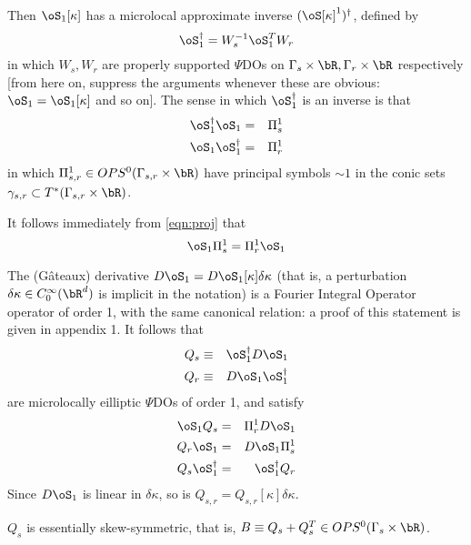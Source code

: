Then 
$\oS_1[\kappa]$ has a microlocal approximate inverse $(\oS[\kappa]^1)^{\dagger}$, defined by 
\begin{equation}
\label{eqn:appinv}
\oS_1^{\dagger} = W_s^{-1}\oS_1^TW_r
\end{equation}
in which $W_s, W_r$ are properly supported $\Psi$DOs on $\Gamma_s \times \bR,\Gamma_r \times \bR$ respectively [from here on, suppress the arguments whenever these are obvious: $\oS_1 = \oS_1[\kappa]$ and so on]. The sense in which $\oS_1^{\dagger}$ is an inverse is that
\begin{eqnarray}
\label{eqn:proj}
\oS_1^{\dagger}\oS_1 &=& \Pi^1_s\\
\oS_1 \oS_1^{\dagger} &=& \Pi^1_r
\end{eqnarray}
in which $\Pi^1_{s,r} \in OPS^0(\Gamma_{s,r}\times \bR)$ have principal symbols $\sim 1$ in the conic sets $\gamma_{s,r} \subset T^*(\Gamma_{s,r}\times \bR)$.

It follows immediately from \ref{eqn:proj} that
\begin{equation}
\label{eqn:picomm}
\oS_1 \Pi^1_s = \Pi^1_r\oS_1
\end{equation}

The (G\^{a}teaux) derivative $D\oS_1 = D\oS_1[\kappa]\delta \kappa$ (that is, a perturbation $\delta \kappa \in C_0^{\infty}(\bR^d)$ is implicit in the notation) is a Fourier Integral Operator operator of order 1, with the same canonical relation: a proof of this statement is given in appendix 1. It follows that
\begin{eqnarray}
\label{eqn:qdef}
Q_s &\equiv& \oS_1^{\dagger}D\oS_1 \nonumber \\
Q_r &\equiv& D\oS_1 \oS_1^{\dagger} 
\end{eqnarray}
are microlocally eilliptic $\Psi$DOs of order 1, and satisfy
\begin{eqnarray}
\label{eqn:qrel}
\oS_1 Q_s &=& \Pi^1_r D\oS_1 \nonumber \\
Q_r \oS_1 &=& D\oS_1 \Pi^1_s \nonumber \\
Q_s\oS_1^{\dagger} &=& \oS_1^{\dagger} Q_r
\end{eqnarray}
Since $D\oS_1$ is linear in $\delta \kappa$, so is $Q_{s,r} = Q_{s,r}[\kappa]\delta \kappa$.

\begin{lemma}\label{thm:qskew} $Q_s$ is essentially skew-symmetric, that is, $B \equiv Q_s+Q_s^T \in OPS^0(\Gamma_s \times \bR)$.
\end{lemma}

